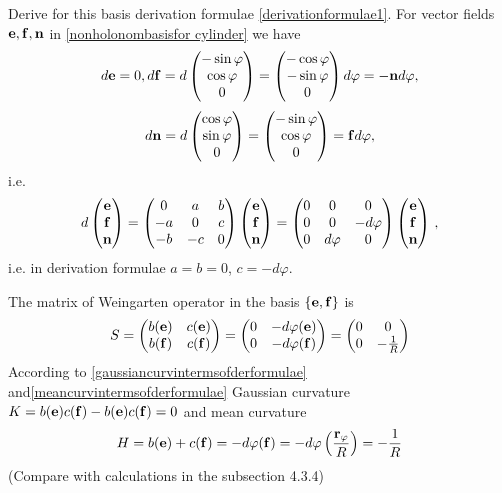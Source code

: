 \documentclass[12pt]{article}
\theoremstyle{theorem}
\numberwithin{equation}{section}
\begin{document}
   Derive for this basis derivation formulae \eqref{derivationformulae1}. For vector fields ${\bf e},{\bf f},{\bf n}$
   in \eqref{nonholonombasisfor cylinder} we have
                   $$
             d{\bf e}=0, d{\bf f}=d\begin{pmatrix}
        -\sin\varphi\cr
        \cos\varphi\cr
          0\cr
   \end{pmatrix}=\begin{pmatrix}
        -\cos\varphi\cr
        -\sin\varphi\cr
          0\cr
   \end{pmatrix}d\varphi=-{\bf n} d\varphi,
          $$
          $$
   d{\bf n}=d\begin{pmatrix}
        \cos \varphi\cr
        \sin\varphi\cr
        0\cr
   \end{pmatrix}=
   \begin{pmatrix}
        -\sin\varphi \cr
        \cos\varphi\cr
        0\cr
   \end{pmatrix}={\bf f} d\varphi,
                   $$
   i.e.
   \begin{equation}\label{derivationformulaefor cylinder}
                    d\begin{pmatrix}
                    {\bf e}\cr{\bf f}\cr{\bf n}\cr
                    \end{pmatrix}=
                    \begin{pmatrix}
                    0&a&b\cr -a&0&c\cr -b&-c&0\cr
                    \end{pmatrix}
                 \begin{pmatrix}
                    {\bf e}\cr{\bf f}\cr{\bf n}\cr
                    \end{pmatrix}=
                     \begin{pmatrix}
                    0&0&0\cr 0&0&-d\varphi\cr 0&d\varphi&0\cr
                    \end{pmatrix}
                 \begin{pmatrix}
                    {\bf e}\cr{\bf f}\cr{\bf n}\cr
                    \end{pmatrix}\,,
                   \end{equation}
  i.e. in derivation formulae $a=b=0$, $c=-d\varphi$.

  The matrix of Weingarten operator in the basis  $\{{\bf e},{\bf f}\}$ is
             $$
     S=
\begin{pmatrix}
b({\bf e})  &c({\bf e})\cr
b({\bf f})  &c({\bf f})\cr
\end{pmatrix}=
\begin{pmatrix}
0  &-d\varphi({\bf e})\cr
0  &-d\varphi({\bf f})\cr
\end{pmatrix}=
\begin{pmatrix}
0  &0\cr
0  &-{1\over R}\cr
\end{pmatrix}
       $$
    According to  \eqref{gaussiancurvintermsofderformulae}  and\eqref{meancurvintermsofderformulae}
                Gaussian curvature $K=b({\bf e})c({\bf f})-b({\bf e})c({\bf f})=0$ and
                mean curvature
                 $$
    H=b({\bf e})+c({\bf f})=-d\varphi({\bf f})=-d\varphi\left({{\bf r}_\varphi\over R}\right)=-{1\over R}
                 $$
  (Compare with calculations in the subsection 4.3.4)
\end{document}
